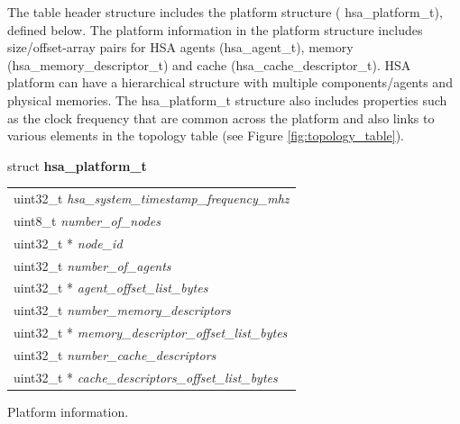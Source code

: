 \documentclass{book}
\newcommand{\hsaarg}[1]{\textit{#1}}
\newcommand{\hsadef}[2]{\hypertarget{#1}{\textbf{#2}}}
\newcommand{\reftyp}[1]{#1}
\begin{document}
 

The table header structure includes the platform structure (
\reftyp{hsa\_platform\_t}), defined below.  The platform information in
the platform structure includes size/offset-array pairs for HSA agents
(\reftyp{hsa\_agent\_t}), memory (\reftyp{hsa\_memory\_descriptor\_t}) and
cache (\reftyp{hsa\_cache\_descriptor\_t}).  HSA platform can have a
hierarchical structure with multiple components/agents and physical
memories.  The \reftyp{hsa\_platform\_t} structure also includes
properties such as the clock frequency that are common across the
platform and also links to various elements in the topology table (see
Figure \ref{fig:topology_table}).

\makeatletter{}

\noindent\begin{tcolorbox}[nobeforeafter,arc=0mm,colframe=white,colback=lightgray,left=0mm]
struct \hsadef{group__STR__hsa__platform_1gac15087b44d735fd1479fc754de556a00}{hsa\_platform\_t} \\
\begin{tabular}{@{}l}
\hspace{1.7em}uint32\_t \hsaarg{hsa\_system\_timestamp\_frequency\_mhz}\\
\hspace{1.7em}uint8\_t \hsaarg{number\_of\_nodes}\\
\hspace{1.7em}uint32\_t * \hsaarg{node\_id}\\
\hspace{1.7em}uint32\_t \hsaarg{number\_of\_agents}\\
\hspace{1.7em}uint32\_t * \hsaarg{agent\_offset\_list\_bytes}\\
\hspace{1.7em}uint32\_t \hsaarg{number\_memory\_descriptors}\\
\hspace{1.7em}uint32\_t * \hsaarg{memory\_descriptor\_offset\_list\_bytes}\\
\hspace{1.7em}uint32\_t \hsaarg{number\_cache\_descriptors}\\
\hspace{1.7em}uint32\_t * \hsaarg{cache\_descriptors\_offset\_list\_bytes}
\end{tabular}

\end{tcolorbox}
Platform information.
\end{document}
